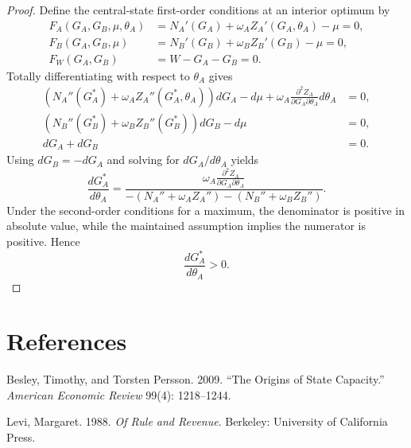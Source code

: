 \documentclass[12pt]{article}
\begin{document}
\begin{proof}
Define the central-state first-order conditions at an interior optimum by
\begin{align*}
F_A(G_A,G_B,\mu,\theta_A) &= N_A'(G_A)+\omega_A Z_A'(G_A,\theta_A)-\mu = 0, \\
F_B(G_A,G_B,\mu) &= N_B'(G_B)+\omega_B Z_B'(G_B)-\mu = 0, \\
F_W(G_A,G_B) &= W-G_A-G_B = 0.
\end{align*}
Totally differentiating with respect to $\theta_A$ gives
\begin{align*}
\left(N_A''(G_A^*)+\omega_A Z_A''(G_A^*,\theta_A)\right)dG_A - d\mu + \omega_A \frac{\partial^2 Z_A}{\partial G_A\partial \theta_A}d\theta_A &= 0,\\
\left(N_B''(G_B^*)+\omega_B Z_B''(G_B^*)\right)dG_B - d\mu &= 0,\\
dG_A+dG_B &= 0.
\end{align*}
Using $dG_B=-dG_A$ and solving for $dG_A/d\theta_A$ yields
\[
\frac{dG_A^*}{d\theta_A}
=
\frac{\omega_A \frac{\partial^2 Z_A}{\partial G_A\partial \theta_A}}
{-\left(N_A''+\omega_A Z_A''\right)-\left(N_B''+\omega_B Z_B''\right)}.
\]
Under the second-order conditions for a maximum, the denominator is positive in absolute value, while the maintained assumption implies the numerator is positive. Hence
\[
\frac{dG_A^*}{d\theta_A}>0.
\]
\end{proof}

\section*{References}

Besley, Timothy, and Torsten Persson. 2009. ``The Origins of State Capacity.'' \emph{American Economic Review} 99(4): 1218--1244.

Levi, Margaret. 1988. \emph{Of Rule and Revenue}. Berkeley: University of California Press.
\end{document}
